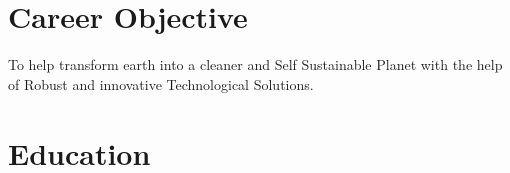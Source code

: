 \documentclass[12pt,a4paper,sans]{moderncv} %
\begin{document}
	
	
	
	\clearpage
	
	
	
	
	\makecvtitle %
	
	\section{Career Objective}
	To help transform earth into a cleaner and Self Sustainable Planet with the help of Robust and innovative Technological Solutions.
	
	
	

\section{Education}

\hfill
\end{document}
